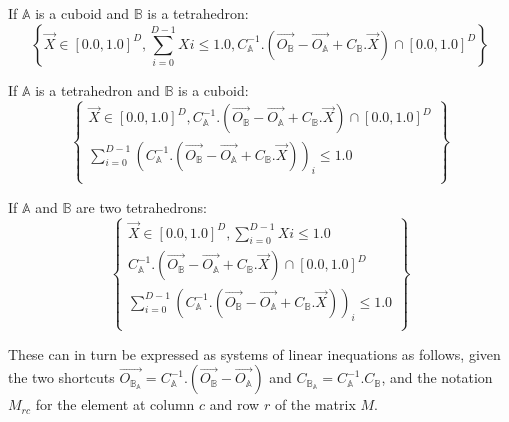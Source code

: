 \documentclass[12pt, a4paper]{article}
\begin{document}
If $\mathbb{A}$ is a cuboid and $\mathbb{B}$ is a tetrahedron:
\begin{equation}
\left\lbrace\overrightarrow{X}\in[0.0,1.0]^D,\sum_{i=0}^{D-1}Xi\le1.0,C_\mathbb{A}^{-1}.(\overrightarrow{O_\mathbb{B}}-\overrightarrow{O_\mathbb{A}}+C_\mathbb{B}.\overrightarrow{X})\cap[0.0,1.0]^D\right\rbrace
\end{equation}

If $\mathbb{A}$ is a tetrahedron and $\mathbb{B}$ is a cuboid:
\begin{equation}
\left\lbrace
\begin{array}{c}
\overrightarrow{X}\in[0.0,1.0]^D,C_\mathbb{A}^{-1}.(\overrightarrow{O_\mathbb{B}}-\overrightarrow{O_\mathbb{A}}+C_\mathbb{B}.\overrightarrow{X})\cap[0.0,1.0]^D\\
\sum_{i=0}^{D-1}\left(C_\mathbb{A}^{-1}.(\overrightarrow{O_\mathbb{B}}-\overrightarrow{O_\mathbb{A}}+C_\mathbb{B}.\overrightarrow{X})\right)_i\le1.0\\
\end{array}
\right\rbrace
\end{equation}

If $\mathbb{A}$ and $\mathbb{B}$ are two tetrahedrons:
\begin{equation}
\left\lbrace
\begin{array}{c}
\overrightarrow{X}\in[0.0,1.0]^D,\sum_{i=0}^{D-1}Xi\le1.0\\
C_\mathbb{A}^{-1}.(\overrightarrow{O_\mathbb{B}}-\overrightarrow{O_\mathbb{A}}+C_\mathbb{B}.\overrightarrow{X})\cap[0.0,1.0]^D\\
\sum_{i=0}^{D-1}\left(C_\mathbb{A}^{-1}.(\overrightarrow{O_\mathbb{B}}-\overrightarrow{O_\mathbb{A}}+C_\mathbb{B}.\overrightarrow{X})\right)_i\le1.0\\
\end{array}
\right\rbrace
\end{equation}

These can in turn be expressed as systems of linear inequations as follows, given the two shortcuts $\overrightarrow{O_{\mathbb{B}_\mathbb{A}}}=C_\mathbb{A}^{-1}.(\overrightarrow{O_\mathbb{B}}-\overrightarrow{O_\mathbb{A}})$ and $C_{\mathbb{B}_\mathbb{A}}=C_\mathbb{A}^{-1}.C_{\mathbb{B}}$, and the notation $M_{rc}$ for the element at column $c$ and row $r$ of the matrix $M$.
\end{document}

